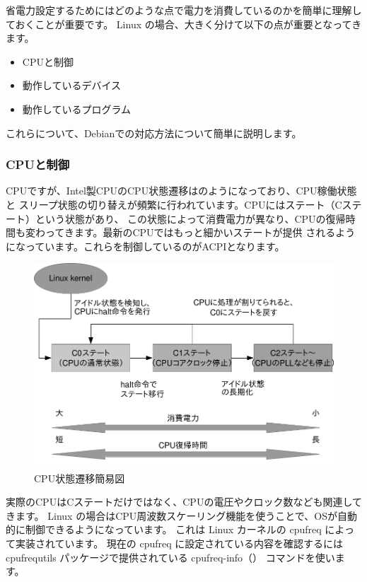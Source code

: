 \documentclass[mingoth,a4paper]{jsarticle}
\begin{document}
省電力設定するためにはどのような点で電力を消費しているのかを簡単に理解しておくことが重要です。
Linux の場合、大きく分けて以下の点が重要となってきます。

\begin{itemize}
\item CPUと制御
\item 動作しているデバイス
\item 動作しているプログラム
\end{itemize}

これらについて、Debianでの対応方法について簡単に説明します。

\subsubsection{CPUと制御}

CPUですが、Intel製CPUのCPU状態遷移はのようになっており、CPU稼働状態と
スリープ状態の切り替えが頻繁に行われています。CPUにはステート（Cステート）という状態があり、
この状態によって消費電力が異なり、CPUの復帰時間も変わってきます。最新のCPUではもっと細かいステートが提供
されるようになっています。これらを制御しているのがACPIとなります。

\begin{figure}[H]
\begin{center}
\includegraphics[width=0.5\hsize]{image201602/cpustate_mono.png}
\end{center}
\caption{CPU状態遷移簡易図} 
\label{fig:cpustate}
\end{figure}

実際のCPUはCステートだけではなく、CPUの電圧やクロック数なども関連してきます。
Linux の場合はCPU周波数スケーリング機能を使うことで、OSが自動的に制御できるようになっています。
これは Linux カーネルの cpufreq によって実装されています。
現在の cpufreq に設定されている内容を確認するには cpufrequtils パッケージで提供されている
cpufreq-info（） コマンドを使います。
\end{document}
